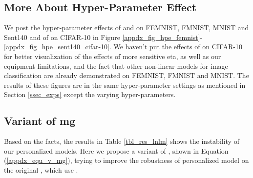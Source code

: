 \documentclass{article}
\begin{document}
        

         
         

         

         



         




          




        




         




          












\subsection{More About Hyper-Parameter Effect}

We post the hyper-parameter effects of  and  on FEMNIST, FMNIST, MNIST and Sent140 and of  on CIFAR-10 in Figure \ref{appdx_fig_hpe_femnist}-\ref{appdx_fig_hpe_sent140_cifar-10}. We haven't put the effects of  on CIFAR-10 for better visualization of the effects of more sensitive eta, as well as our equipment limitations, and the fact that other non-linear models for image classification are already demonstrated on FEMNIST, FMNIST and MNIST. The results of these figures are in the same hyper-parameter settings as mentioned in Section \ref{ssec_exps} except the varying hyper-parameters.

\subsection{Variant of \textbf{mg}}
\label{appdx_ssec_map}











Based on the facts, the results in Table \ref{tbl_res_lnlm} shows the instability of our personalized models. Here we propose a variant of , shown in Equation (\ref{appdx_equ_v_mg}), trying to improve the robustness of personalized model on the original , which use .
\end{document}
